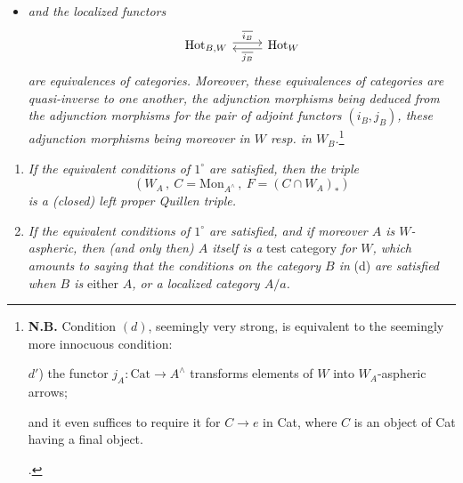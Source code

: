 \documentclass[11pt]{article}
\newcommand{\printedpage}[1]{\marginpar{\footnotesize p.~#1}}
\newcommand{\msp}[1]{\marginpar{\footnotesize [#1]}}
\begin{document}
\printedpage{59}

\begin{itemize}[label={},leftmargin=4.5em]
\item \textit{and the localized functors}
\[
\begin{tikzcd}
\mathrm{Hot}_{B,W} \arrow[r, shift left, "\overline{i_B}"] & \mathrm{Hot}_W \arrow[l, shift left, "\overline{j_B}"]
\end{tikzcd}
\]
\textit{are equivalences of categories. Moreover, these equivalences of categories are quasi-inverse to one another, the adjunction morphisms being deduced from the adjunction morphisms for the pair of adjoint functors $(i_B, j_B)$, these adjunction morphisms being moreover in $W$ resp. in $W_B$.}\footnote[38]{\textbf{N.B.} Condition $(d)$, seemingly very strong, is equivalent to the seemingly more innocuous condition:\par
$d'$) the functor $j_A : \mathrm{Cat} \longrightarrow A^\wedge$ transforms elements of $W$ into $W_A$-aspheric arrows;\par\noindent
and it even suffices to require it for $C \longrightarrow e$ in Cat, where $C$ is an object of Cat having a final object.\par\noindent
.}
\end{itemize}

\msp{page 107}

\begin{enumerate}[leftmargin=2.5em]
\item[$2^\circ$)] \textit{If the equivalent conditions of $1^\circ$ are satisfied, then the triple}
\[
(W_A\,,\ C = \mathrm{Mon}_{A^\wedge}\,,\ F = (C \cap W_A)_*)
\]
\textit{is a (closed) left proper Quillen triple.}
\item[$3^\circ$)] \textit{If the equivalent conditions of $1^\circ$ are satisfied, and if moreover $A$ is $W$-aspheric, then (and only then) $A$ itself is a} test category \textit{for $W$, which amounts to saying that the conditions on the category $B$ in} (d) \textit{are satisfied when $B$ is} either \textit{$A$, or a localized category $A/a$.}
\end{enumerate}
\end{document}
